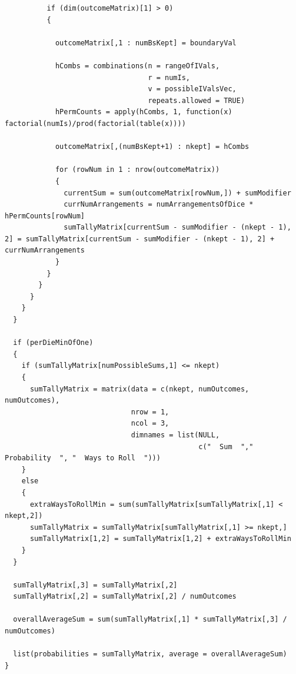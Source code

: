 \documentclass[12pt]{article}
\begin{document}
\begin{lstlisting}
          if (dim(outcomeMatrix)[1] > 0)
          {
            
            outcomeMatrix[,1 : numBsKept] = boundaryVal
            
            hCombs = combinations(n = rangeOfIVals,
                                  r = numIs,
                                  v = possibleIValsVec,
                                  repeats.allowed = TRUE)
            hPermCounts = apply(hCombs, 1, function(x) factorial(numIs)/prod(factorial(table(x))))
            
            outcomeMatrix[,(numBsKept+1) : nkept] = hCombs
            
            for (rowNum in 1 : nrow(outcomeMatrix))
            {
              currentSum = sum(outcomeMatrix[rowNum,]) + sumModifier
              currNumArrangements = numArrangementsOfDice * hPermCounts[rowNum]
              sumTallyMatrix[currentSum - sumModifier - (nkept - 1), 2] = sumTallyMatrix[currentSum - sumModifier - (nkept - 1), 2] + currNumArrangements
            }
          }
        }
      }
    }
  }
  
  if (perDieMinOfOne)
  {
    if (sumTallyMatrix[numPossibleSums,1] <= nkept)
    {
      sumTallyMatrix = matrix(data = c(nkept, numOutcomes, numOutcomes),
                              nrow = 1,
                              ncol = 3,
                              dimnames = list(NULL,
                                              c("  Sum  ","  Probability  ", "  Ways to Roll  ")))
    }
    else
    {
      extraWaysToRollMin = sum(sumTallyMatrix[sumTallyMatrix[,1] < nkept,2])
      sumTallyMatrix = sumTallyMatrix[sumTallyMatrix[,1] >= nkept,]
      sumTallyMatrix[1,2] = sumTallyMatrix[1,2] + extraWaysToRollMin
    }
  }
  
  sumTallyMatrix[,3] = sumTallyMatrix[,2]
  sumTallyMatrix[,2] = sumTallyMatrix[,2] / numOutcomes
  
  overallAverageSum = sum(sumTallyMatrix[,1] * sumTallyMatrix[,3] / numOutcomes)
  
  list(probabilities = sumTallyMatrix, average = overallAverageSum)
}
\end{lstlisting}
\end{document}
